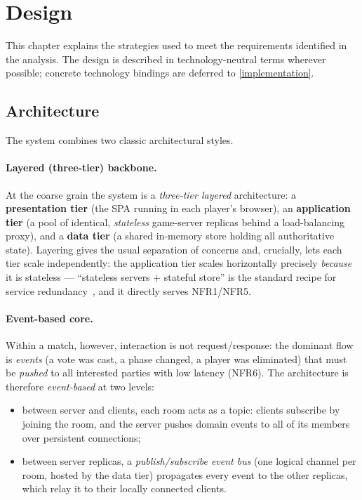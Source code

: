 \documentclass{scrartcl}
\begin{document}
\section{Design}\label{design}

This chapter explains the strategies used to meet the requirements identified
in the analysis. The design is described in technology-neutral terms
wherever possible; concrete technology bindings are deferred to
\cref{implementation}.

\subsection{Architecture}\label{architecture}

The system combines two classic architectural styles.

\paragraph{Layered (three-tier) backbone.}
At the coarse grain the system is a \emph{three-tier layered} architecture:
a \textbf{presentation tier} (the SPA running in each player's browser), an
\textbf{application tier} (a pool of identical, \emph{stateless} game-server
replicas behind a load-balancing proxy), and a \textbf{data tier} (a shared
in-memory store holding all authoritative state). Layering gives the usual
separation of concerns and, crucially, lets each tier scale independently:
the application tier scales horizontally precisely \emph{because} it is
stateless --- ``stateless servers + stateful store'' is the standard recipe
for service redundancy~\cite{kleppmann2017designing}, and it directly serves
NFR1/NFR5.

\paragraph{Event-based core.}
Within a match, however, interaction is not request/response: the dominant
flow is \emph{events} (a vote was cast, a phase changed, a player was
eliminated) that must be \emph{pushed} to all interested parties with low
latency (NFR6). The architecture is therefore \emph{event-based} at two
levels:

\begin{itemize}
  \item between server and clients, each room acts as a topic: clients
  subscribe by joining the room, and the server pushes domain events to all
  of its members over persistent connections;

  \item between server replicas, a \emph{publish/subscribe event bus} (one
  logical channel per room, hosted by the data tier) propagates every
  event to the other replicas, which relay it to their locally connected
  clients.
\end{itemize}
\end{document}
